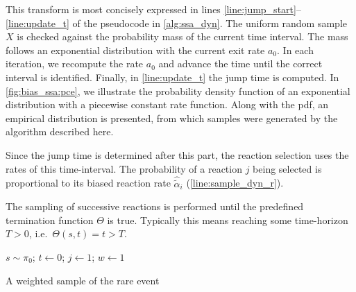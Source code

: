 This transform is most concisely expressed in lines
\ref{line:jump_start}--\ref{line:update_t} of the pseudocode in
\autoref{alg:ssa_dyn}.
The uniform random sample $X$ is checked against the probability mass
of the current time interval.
The mass follows an exponential distribution with the current exit rate $a_0$.
In each iteration, we recompute the rate $a_0$ and advance the time
until the correct interval is identified.
Finally, in \autoref{line:update_t} the jump time is computed.
In \autoref{fig:bias_ssa:pce}, we illustrate the probability density
function of an exponential distribution with a piecewise constant rate function.
Along with the pdf, an empirical distribution is presented, from
which samples were generated by the algorithm described here.

Since the jump time is determined after this part, the reaction
selection uses the rates of this time-interval.
The probability of a reaction $j$ being selected is proportional to
its biased reaction rate $\hat{\tilde{\alpha}}_{i}$
(\autoref{line:sample_dyn_r}).

The sampling of successive reactions is performed until the
predefined termination function $\Theta$ is true.
Typically this means reaching some time-horizon $T>0$, i.e.\ $\Theta(s, t)=t>T$.
\begin{algorithm}
  $s\sim\pi_0$; $t\leftarrow 0$; $j\leftarrow 1$; $w\leftarrow 1$\;
  \caption{\label{alg:ssa_dyn}A weighted sample of the rare event}
\end{algorithm}

